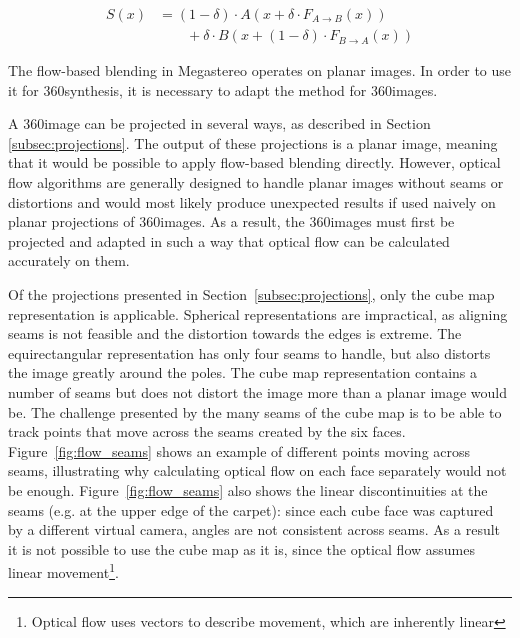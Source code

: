 \begin{align}
S(x) &= (1-\delta ) \cdot A( x + \delta \cdot F_{A\to B}(x)) \nonumber\\
     &\qquad {} + \delta \cdot B( x + (1-\delta) \cdot F_{B\to A}(x)) \label{eq:flow_blending}
   \end{align}

The flow-based blending in Megastereo operates on planar images. In order to use it for 360\degree synthesis, it is necessary to adapt the method for 360\degree images.

A 360\degree image can be projected in several ways, as described in Section \ref{subsec:projections}. The output of these projections is a planar image, meaning that it would be possible to apply flow-based blending directly. However, optical flow algorithms are generally designed to handle planar images without seams or distortions and would most likely produce unexpected results if used naively on planar projections of 360\degree images. As a result, the 360\degree images must first be projected and adapted in such a way that optical flow can be calculated accurately on them.


Of the projections presented in Section~\ref{subsec:projections}, only the cube map representation is applicable. Spherical representations are impractical, as aligning seams is not feasible and the distortion towards the edges is extreme. The equirectangular representation has only four seams to handle, but also distorts the image greatly around the poles. The cube map representation contains a number of seams but does not distort the image more than a planar image would be. 
The challenge presented by the many seams of the cube map is to be able to track points that move across the seams created by the six faces. Figure~\ref{fig:flow_seams} shows an example of different points moving across seams, illustrating why calculating optical flow on each face separately would not be enough. Figure~\ref{fig:flow_seams} also shows the linear discontinuities at the seams (e.g. at the upper edge of the carpet): since each cube face was captured by a different virtual camera, angles are not consistent across seams. As a result it is not possible to use the cube map as it is, since the optical flow assumes linear movement\footnote{Optical flow uses vectors to describe movement, which are inherently linear}.

